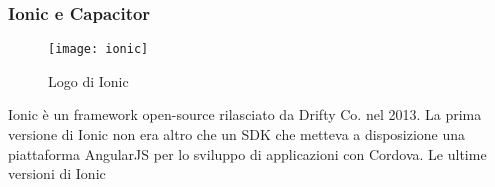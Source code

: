 \subsubsection{Ionic e Capacitor}

\begin{figure}[h]
	\begin{center}
		\texttt{[image: ionic]}
		\caption{Logo di Ionic}
	\end{center}
\end{figure}

Ionic è un framework open-source rilasciato da Drifty Co. nel 2013. La prima versione di Ionic non era altro che un SDK che metteva a disposizione una
piattaforma AngularJS per lo sviluppo di applicazioni con Cordova. Le ultime versioni di Ionic 
